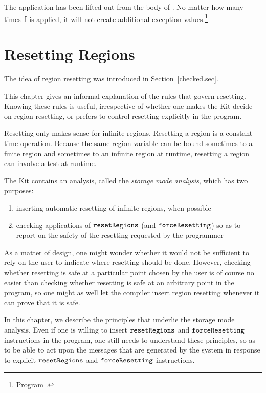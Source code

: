 \documentclass[12pt]{book}
\begin{document}
The application  has been lifted out from the body of
. No matter how many times {\tt f} is applied, it will not
create additional exception values.\footnote{Program
  .}

\chapter{Resetting Regions}
\label{storagemodes.sec}
The idea of region resetting was introduced in
Section~\ref{checked.sec}.
%

This chapter gives an informal explanation of the rules that govern
resetting. Knowing these rules is useful, irrespective of whether one
makes the Kit decide on region resetting, or prefers to control
resetting explicitly in the program.

Resetting only makes sense for infinite regions.  Resetting a region
is a constant-time operation.  Because the same region variable can be
bound sometimes to a finite region and sometimes to an infinite region
at runtime, resetting a region can involve a test at runtime.

The Kit contains an analysis, called the {\em storage mode analysis},
which has two purposes:
\begin{enumerate}
\item inserting automatic resetting of infinite regions, when possible
\item checking applications of $\hbox{\tt resetRegions}$ (and
  $\hbox{\tt forceResetting}$) so as to report on the safety of the resetting requested
  by the programmer
\end{enumerate}

As a matter of design, one might wonder whether it would not be
sufficient to rely on the user to indicate where resetting should be
done. However, checking whether resetting is safe at a particular
point chosen by the user is of course no easier than checking whether
resetting is safe at an arbitrary point in the program, so one might
as well let the compiler insert region resetting whenever it can prove
that it is safe.

In this chapter, we describe the principles that underlie the storage
mode analysis. Even if one is willing to insert $\hbox{\tt resetRegions}$ and
$\hbox{\tt forceResetting}$ instructions in the program, one still needs to understand
these principles, so as to be able to act upon the messages that are
generated by the system in response to explicit $\hbox{\tt resetRegions}$ and
$\hbox{\tt forceResetting}$ instructions.
\end{document}
